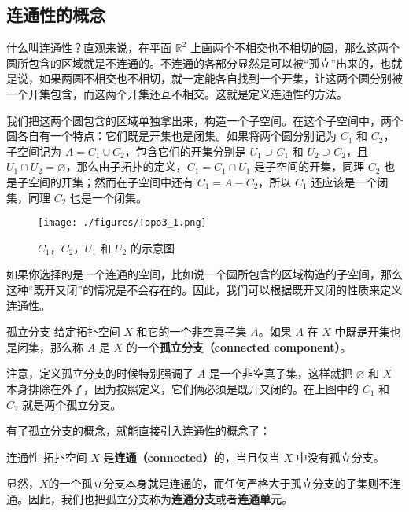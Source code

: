 

\subsection{连通性的概念}
什么叫连通性？直观来说，在平面 $\mathbb{R}^2$ 上画两个不相交也不相切的圆，那么这两个圆所包含的区域就是不连通的。不连通的各部分显然是可以被“孤立”出来的，也就是说，如果两圆不相交也不相切，就一定能各自找到一个开集，让这两个圆分别被一个开集包含，而这两个开集还互不相交。这就是定义连通性的方法。

我们把这两个圆包含的区域单独拿出来，构造一个子空间。在这个子空间中，两个圆各自有一个特点：它们既是开集也是闭集。如果将两个圆分别记为 $C_1$ 和 $C_2$，子空间记为 $A=C_1\cup C_2$，包含它们的开集分别是 $U_1\supseteq C_1$ 和 $U_2\supseteq C_2$，且 $U_1\cap U_2=\varnothing$，那么由子拓扑的定义，$C_1=C_1\cap U_1$ 是子空间的开集，同理 $C_2$ 也是子空间的开集；然而在子空间中还有 $C_1=A-C_2$，所以 $C_1$ 还应该是一个闭集，同理 $C_2$ 也是一个闭集。

\begin{figure}[ht]
\centering
\texttt{[image: ./figures/Topo3\_1.png]}
\caption{$C_1$，$C_2$，$U_1$ 和 $U_2$ 的示意图} \label{Topo3_fig1}
\end{figure}

如果你选择的是一个连通的空间，比如说一个圆所包含的区域构造的子空间，那么这种“既开又闭”的情况是不会存在的。因此，我们可以根据既开又闭的性质来定义连通性。

\begin{definition}{孤立分支}
给定拓扑空间 $X$ 和它的一个非空真子集 $A$。如果 $A$ 在 $X$ 中既是开集也是闭集，那么称 $A$ 是 $X$ 的一个\textbf{孤立分支（connected component）}。
\end{definition}

注意，定义孤立分支的时候特别强调了 $A$ 是一个非空真子集，这样就把 $\varnothing$ 和 $X$ 本身排除在外了，因为按照定义，它们俩必须是既开又闭的。在上图中的 $C_1$ 和 $C_2$ 就是两个孤立分支。

有了孤立分支的概念，就能直接引入连通性的概念了：

\begin{definition}{连通性}
拓扑空间 $X$ 是\textbf{连通（connected）}的，当且仅当 $X$ 中没有孤立分支。
\end{definition}

显然，$X$的一个孤立分支本身就是连通的，而任何严格大于孤立分支的子集则不连通。因此，我们也把孤立分支称为\textbf{连通分支}或者\textbf{连通单元}。

